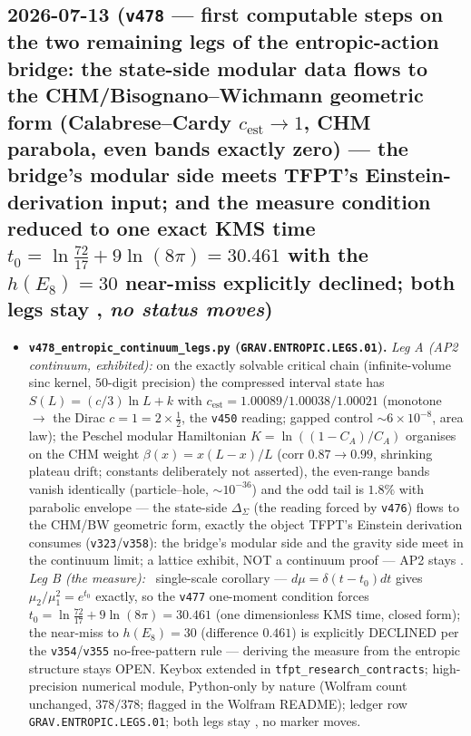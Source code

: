 \subsection*{2026-07-13 (\texttt{v478} --- first computable steps on the two remaining legs of the entropic-action bridge: the state-side modular data flows to the CHM/Bisognano--Wichmann geometric form (Calabrese--Cardy $c_{\mathrm{est}}{\to}1$, CHM parabola, even bands exactly zero) --- the bridge's modular side meets TFPT's Einstein-derivation input; and the measure condition reduced to one exact KMS time $t_0=\ln\tfrac{72}{17}+9\ln(8\pi)=30.461$ with the $h(E_8){=}30$ near-miss explicitly declined; both legs stay \mO, \emph{no status moves})}
\begin{itemize}[leftmargin=1.5em]
\item \textbf{\texttt{v478\_entropic\_continuum\_legs.py} (\texttt{GRAV.ENTROPIC.LEGS.01}).}
\emph{Leg A (AP2 continuum, exhibited):} on the exactly solvable critical chain (infinite-volume sinc
kernel, $50$-digit precision) the compressed interval state has $S(L){=}(c/3)\ln L{+}k$ with
$c_{\mathrm{est}}{=}1.00089/1.00038/1.00021$ (monotone $\to$ the Dirac $c{=}1{=}2{\times}\tfrac12$, the
\texttt{v450} reading; gapped control $\sim6{\times}10^{-8}$, area law); the Peschel modular Hamiltonian
$K{=}\ln((1{-}C_A)/C_A)$ organises on the CHM weight $\beta(x){=}x(L{-}x)/L$ (corr $0.87{\to}0.99$,
shrinking plateau drift; constants deliberately not asserted), the even-range bands vanish identically
(particle--hole, $\sim10^{-36}$) and the odd tail is $1.8\%$ with parabolic envelope --- the state-side
$\Delta_\Sigma$ (the reading forced by \texttt{v476}) flows to the CHM/BW geometric form, exactly the
object TFPT's Einstein derivation consumes (\texttt{v323}/\texttt{v358}): the bridge's modular side and
the gravity side meet in the continuum limit; a lattice exhibit, NOT a continuum proof --- AP2 stays
\mO. \emph{Leg B (the measure):} \mE\ single-scale corollary --- $d\mu{=}\delta(t{-}t_0)dt$ gives
$\mu_2/\mu_1^2{=}e^{t_0}$ exactly, so the \texttt{v477} one-moment condition forces
$t_0{=}\ln\tfrac{72}{17}{+}9\ln(8\pi){=}30.461$ (one dimensionless KMS time, closed form); the
near-miss to $h(E_8){=}30$ (difference $0.461$) is explicitly DECLINED per the
\texttt{v354}/\texttt{v355} no-free-pattern rule --- deriving the measure from the entropic structure
stays OPEN. Keybox extended in \texttt{tfpt\_research\_contracts}; high-precision numerical module,
Python-only by nature (Wolfram count unchanged, $378/378$; flagged in the Wolfram README); ledger row
\texttt{GRAV.ENTROPIC.LEGS.01}; both legs stay \mO, no marker moves.
\end{itemize}

